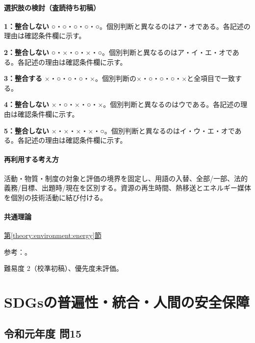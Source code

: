 \paragraph{選択肢の検討（査読待ち初稿）}\mbox{}\par

\noindent\textbf{1：整合しない} ○・○・○・○・○。個別判断と異なるのはア・オである。各記述の理由は確認条件欄に示す。\par

\noindent\textbf{2：整合しない} ○・×・○・×・○。個別判断と異なるのはア・イ・エ・オである。各記述の理由は確認条件欄に示す。\par

\noindent\textbf{3：整合する} ×・○・○・○・×。個別判断の×・○・○・○・×と全項目で一致する。\par

\noindent\textbf{4：整合しない} ×・○・×・○・×。個別判断と異なるのはウである。各記述の理由は確認条件欄に示す。\par

\noindent\textbf{5：整合しない} ×・×・×・×・○。個別判断と異なるのはイ・ウ・エ・オである。各記述の理由は確認条件欄に示す。\par

\paragraph{再利用する考え方} 活動・物質・制度の対象と評価の境界を固定し、用語の入替、全部/一部、法的義務/目標、出題時/現在を区別する。資源の再生時間、熱移送とエネルギー媒体を個別の技術活動に結び付ける。

\paragraph{共通理論} \hyperref[theory:environment:energy]{第\ref*{theory:environment:energy}節}

\par 参考：\cite{env_renewable2022,env_hydrogen2015,env_biomass,env_paris}。

\par 難易度 2（校準初稿）、優先度未評価。

\section{SDGsの普遍性・統合・人間の安全保障}

\subsection{令和元年度 問15}
\label{q:r01-reg-apt-15}

